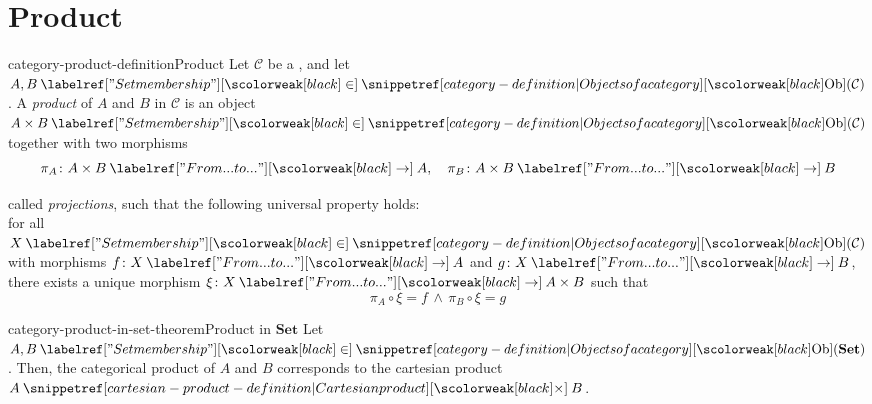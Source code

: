 \documentclass[preview]{standalone}
\begin{document}
\genpage

\section{Product}

\begin{snippetdefinition}{category-product-definition}{Product}
    Let \(\mathcal{C}\) be a \category, and let \(A,B\in \catob(\mathcal{C})\).
    A \emph{product} of \(A\) and \(B\) in \(\mathcal{C}\) is an object \(A \times B \in \catob(\mathcal{C})\)
    together with two morphisms
    \[
        \pi_A \colon A \times B \fromto A, \quad
        \pi_B \colon A \times B \fromto B
    \]
    \begin{minipage}{0.65\textwidth}
        called \emph{projections}, such that the following universal property holds: \\
        for all \(X \in \catob(\mathcal{C})\) with morphisms
        \(f\colon X \fromto A\) and \(g\colon X \fromto B\), there exists a unique morphism
        \(\xi \colon X \fromto A \times B\) such that
        \[
            \pi_A \circ \xi = f \, \land \, \pi_B \circ \xi = g
        \]
    \end{minipage}
    \begin{minipage}{0.35\textwidth}
        \begin{center}
        \end{center}
    \end{minipage}
\end{snippetdefinition}

\begin{snippettheorem}{category-product-in-set-theorem}{Product in \(\mathbf{Set}\)}
    Let \(A,B \in \catob(\mathbf{Set})\). Then,
    the categorical product of \(A\) and \(B\) corresponds to the cartesian product
    \(A \cartesianprod B\).
\end{snippettheorem}
\end{document}
